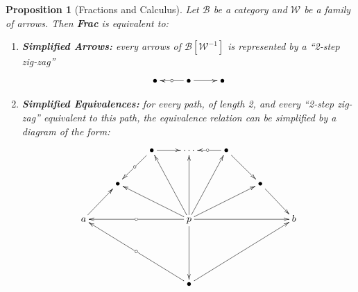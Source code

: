 \documentclass{article}
\numberwithin{equation}{section}
\theoremstyle{definition}
\theoremstyle{plain}
\newtheorem{proposition}[equation]{Proposition}
\begin{document}
\begin{proposition}[Fractions and Calculus]  Let $\mathcal{B}$ be a category and $\mathcal{W}$ be a family of arrows. Then \textbf{Frac} is equivalent to:
	\begin{enumerate}[label = $(\roman*)$]
		\item \textbf{Simplified Arrows:} every arrows of $\mathcal{B}[\mathcal{W}^{-1}]$ is represented by a ``2-step zig-zag'' \[\xymatrix{\bullet & \bullet \ar[l]|{\circ} \ar[r] & \bullet}\]
		\item \textbf{Simplified Equivalences:} for every path, \textnormal{of length 2}, and every ``2-step zig-zag'' equivalent to this path, the equivalence relation can be simplified by a diagram of the form:
		\[\xymatrix{
			&& \bullet \ar[r] & \cdots \ar@{<-}[r]|{\circ} & \bullet \ar[dr]\\
			& \bullet \ar@{<-}[ur]|{\circ} &&&& \bullet \ar[dr]\\
			a \ar[ur]  &&& p \ar[lll]|{\circ} \ar[ull] \ar[uul] \ar[uu] \ar[uur] \ar[urr] \ar[rrr] \ar[dd] &&& b\\
			\\
			&&& \bullet \ar[uulll]|{\circ} \ar[uurrr]\\
		}\]
	\end{enumerate}
\end{proposition}
\end{document}
